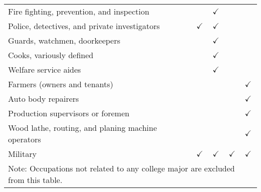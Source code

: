 \begin{tabular}[t]{llllll}
Fire fighting, prevention, and inspection &  &  & $\checkmark$ &  & \\
Police, detectives, and private investigators &  & $\checkmark$ & $\checkmark$ &  & \\
Guards, watchmen, doorkeepers &  &  & $\checkmark$ &  & \\
Cooks, variously defined &  &  & $\checkmark$ &  & \\
Welfare service aides &  &  & $\checkmark$ &  & \\
Farmers (owners and tenants) &  &  &  &  & $\checkmark$\\
Auto body repairers &  &  &  &  & $\checkmark$\\
Production supervisors or foremen &  &  &  &  & $\checkmark$\\
Wood lathe, routing, and planing machine operators &  &  &  &  & $\checkmark$\\
Military &  & $\checkmark$ & $\checkmark$ & $\checkmark$ & $\checkmark$\\
\bottomrule
\multicolumn{6}{l}{\textsuperscript{} Note: Occupations not related to any college major are excluded from this table.}\\
\end{tabular}

